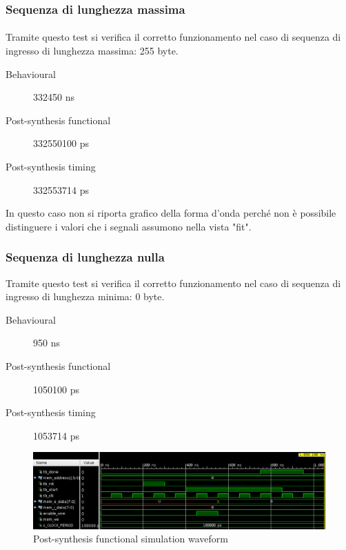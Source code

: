 \documentclass{article}
\begin{document}
\subsubsection{Sequenza di lunghezza massima}
\paragraph{}Tramite questo test si verifica il corretto funzionamento nel caso di sequenza di ingresso di lunghezza massima: 255 byte.
\begin{description}
	\item[Behavioural] 332450 ns
	\item[Post-synthesis functional] 332550100 ps
	\item[Post-synthesis timing] 332553714 ps
\end{description}
In questo caso non si riporta grafico della forma d'onda perché non è possibile distinguere i valori che i segnali assumono nella vista "fit".

\subsubsection{Sequenza di lunghezza nulla}
Tramite questo test si verifica il corretto funzionamento nel caso di sequenza di ingresso di lunghezza minima: 0 byte.
\begin{description}
	\item[Behavioural] 950 ns
	\item[Post-synthesis functional] 1050100 ps
	\item[Post-synthesis timing] 1053714 ps
\end{description}
\begin{figure}[H]
	\centering
	\includegraphics[width=1\textwidth]{assets/tb4.png}
	\caption{Post-synthesis functional simulation waveform}
\end{figure}
\end{document}
